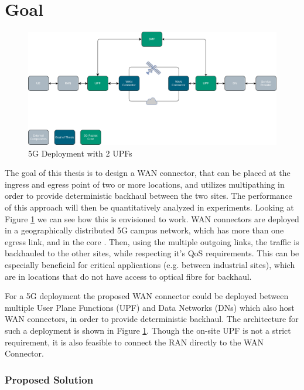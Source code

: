 \section{Goal}
\label{sec:goal}

\begin{figure}[h]
    \centering
        \includegraphics[width=\textwidth]{fig/telco-use-case-2.png}
        \caption{5G Deployment with 2 UPFs}
        \label{fig:telco}
\end{figure}

The goal of this thesis is to design a WAN connector, that can be placed at the ingress and egress point of two or more locations, and utilizes multipathing in order to provide deterministic backhaul between the two sites. The performance of this approach will then be quantitatively analyzed in experiments. Looking at Figure \ref{fig:telco} we can see how this is envisioned to work. WAN connectors are deployed in a geographically distributed 5G campus network, which has more than one egress link, and in the core . Then, using the multiple outgoing links, the traffic is backhauled to the other sites, while respecting it's QoS requirements. This can be especially beneficial for critical applications (e.g. between industrial sites), which are in locations that do not have access to optical fibre for backhaul.

For a 5G deployment the proposed WAN connector could be deployed between multiple User Plane Functions (UPF) and Data Networks (DNs) which also host WAN connectors, in order to provide deterministic backhaul. The architecture for such a deployment is shown in Figure \ref{fig:telco}. Though the on-site UPF is not a strict requirement, it is also feasible to connect the RAN directly to the WAN Connector.



\subsubsection{Proposed Solution}

